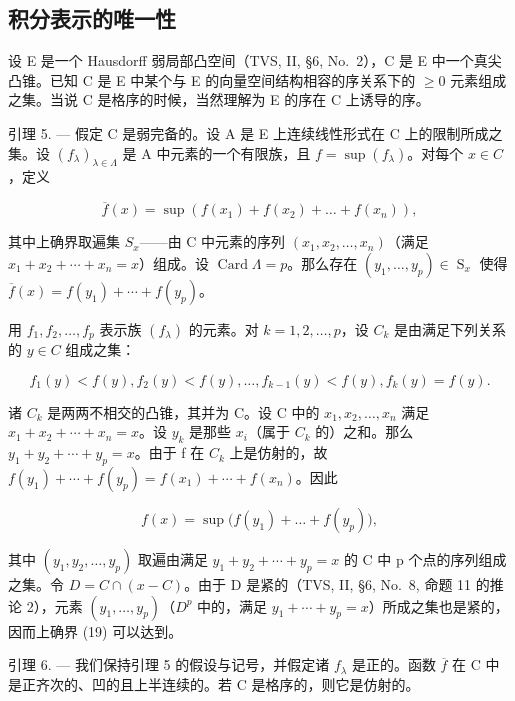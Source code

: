 \subsection{积分表示的唯一性}

设 E 是一个 Hausdorff 弱局部凸空间（TVS, II, §6, No.~2），C 是 E 中一个真尖凸锥。已知 C 是 E 中某个与 E 的向量空间结构相容的序关系下的 \(\geqslant0\) 元素组成之集。当说 C 是格序的时候，当然理解为 E 的序在 C 上诱导的序。

引理 5. --- 假定 C 是弱完备的。设 A 是 E 上连续线性形式在 C 上的限制所成之集。设 \((f_{\lambda})_{\lambda \in \Lambda}\) 是 A 中元素的一个有限族，且 \(f = \sup(f_{\lambda})\)。对每个 \(x \in C\)，定义

\[
\overline {{{f}}} (x) = \sup \left(f (x _ {1}) + f (x _ {2}) + \dots + f (x _ {n})\right),
\]

其中上确界取遍集 \(S_{x}\)——由 C 中元素的序列 \((x_{1}, x_{2}, \ldots, x_{n})\)（满足 \(x_{1} + x_{2} + \cdots + x_{n} = x\)）组成。设 \(\operatorname{Card}\Lambda = p\)。那么存在 \((y_{1}, \ldots, y_{p}) \in \operatorname{S}_{x}\) 使得 \(\overline{f}(x) = f(y_{1}) + \cdots + f(y_{p})\)。

用 \(f_1, f_2, \ldots, f_p\) 表示族 \((f_\lambda)\) 的元素。对 \(k = 1, 2, \ldots, p\)，设 \(C_k\) 是由满足下列关系的 \(y \in C\) 组成之集：

\[
f _ {1} (y) <   f (y), f _ {2} (y) <   f (y), \dots , f _ {k - 1} (y) <   f (y), f _ {k} (y) = f (y).
\]

诸 \(C_{k}\) 是两两不相交的凸锥，其并为 C。设 C 中的 \(x_{1}, x_{2}, \ldots, x_{n}\) 满足 \(x_{1} + x_{2} + \cdots + x_{n} = x\)。设 \(y_{k}\) 是那些 \(x_{i}\)（属于 \(C_{k}\) 的）之和。那么 \(y_{1} + y_{2} + \cdots + y_{p} = x\)。由于 f 在 \(C_{k}\) 上是仿射的，故 \(f(y_{1}) + \cdots + f(y_{p}) = f(x_{1}) + \cdots + f(x_{n})\)。因此

\[
f (x) = \sup \bigl (f (y _ {1}) + \dots + f (y _ {p}) \bigr),\tag{19}
\]

其中 \((y_{1}, y_{2}, \ldots, y_{p})\) 取遍由满足 \(y_{1} + y_{2} + \cdots + y_{p} = x\) 的 C 中 p 个点的序列组成之集。令 \(D = C \cap (x - C)\)。由于 D 是紧的（TVS, II, §6, No.~8, 命题 11 的推论 2），元素 \((y_{1}, \ldots, y_{p})\)（\(D^{p}\) 中的，满足 \(y_{1} + \cdots + y_{p} = x\)）所成之集也是紧的，因而上确界 (19) 可以达到。

引理 6. --- 我们保持引理 5 的假设与记号，并假定诸 \(f_{\lambda}\) 是正的。函数 \(\overline{f}\) 在 C 中是正齐次的、凹的且上半连续的。若 C 是格序的，则它是仿射的。

